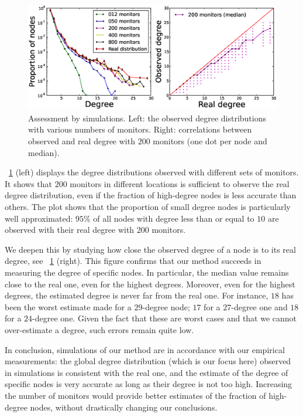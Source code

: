 \documentclass[conference]{IEEEtran}
\newcommand{\noteperso}[1]{\begin{center}
\fbox{\begin{minipage}{0.9\columnwidth}#1\end{minipage}}\end{center}}
\begin{document}
\begin{figure} \centering
\includegraphics[width=\columnwidth]{figures/fig-valid.eps}
\caption{Assessment by simulations. Left: the observed degree distributions with various numbers of monitors. Right: correlations between observed and real degree with $200$ monitors (one dot per node and median).}
\label{fig:assess-dist}
\end{figure}

\figurename~\ref{fig:assess-dist} (left) displays the degree distributions observed with different sets of monitors. It shows that $200$ monitors in different locations is sufficient to observe the real degree distribution, even if the fraction of high-degree nodes is less accurate than others. The plot shows that the proportion of small degree nodes is particularly well approximated: $95\%$ of all nodes with degree less than or equal to $10$ are observed with their real degree with $200$ monitors.


We deepen this by studying how close the observed degree of a node is to its real degree, see \figurename~\ref{fig:assess-dist} (right). This figure confirms that our method succeeds in measuring the degree of specific nodes. In particular, the median value remains close to the real one, even for the highest degrees. Moreover, even for the highest degrees, the estimated degree is never far from the real one. For instance, $18$ has been the worst estimate made for a $29$-degree node; $17$ for a $27$-degree one and $18$ for a $24$-degree one. Given the fact that these are worst cases and that we cannot over-estimate a degree, such errors remain quite low.

In conclusion, simulations of our method are in accordance with our empirical measurements: the global degree distribution (which is our focus here) observed in simulations is consistent with the real one, and the estimate of the degree of specific nodes is very accurate as long as their degree is not too high. Increasing the number of monitors would provide better estimates of the fraction of high-degree nodes, without drastically changing our conclusions.
\end{document}
